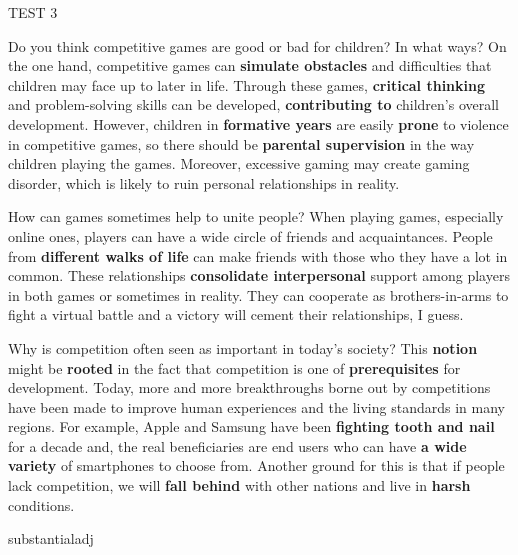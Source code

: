 \begin{glossarymc}[Cambridge 6]
\begin{test}{TEST 3}
    \begin{qa}{Do you think competitive games are good or bad for children? In what ways?}
    On the one hand, competitive games can \textbf{simulate obstacles} and difficulties that children may face up to later in life. Through these games, \textbf{critical thinking} and problem-solving skills can be developed, \textbf{contributing to} children's overall development. However, children in \textbf{formative years} are easily \textbf{prone} to violence in competitive games, so there should be \textbf{parental supervision} in the way children playing the games. Moreover, excessive gaming may create gaming disorder, which is likely to ruin personal relationships in reality.
    \end{qa}

    \begin{qa}{How can games sometimes help to unite people?}
    When playing games, especially online ones, players can have a wide circle of friends and acquaintances. People from \textbf{different walks of life} can make friends with those who they have a lot in common. These relationships \textbf{consolidate interpersonal} support among players in both games or sometimes in reality. They can cooperate as brothers-in-arms to fight a virtual battle and a victory will cement their relationships, I guess.
    \end{qa}

    \begin{qa}{Why is competition often seen as important in today's society?}
    This \textbf{notion} might be \textbf{rooted} in the fact that competition is one of \textbf{prerequisites} for development. Today, more and more breakthroughs borne out by competitions have been made to improve human experiences and the living standards in many regions. For example, Apple and Samsung have been \textbf{fighting tooth and nail} for a decade and, the real beneficiaries are end users who can have \textbf{a wide variety} of smartphones to choose from. Another ground for this is that if people lack competition, we will \textbf{fall behind} with other nations and live in \textbf{harsh} conditions.
    \end{qa}

        \begin{VocabExplain}[Part 3]
            \begin{ExplainCard}{substantial}{adj}
            \end{ExplainCard}


\end{VocabExplain}
\end{test}
\end{glossarymc}
